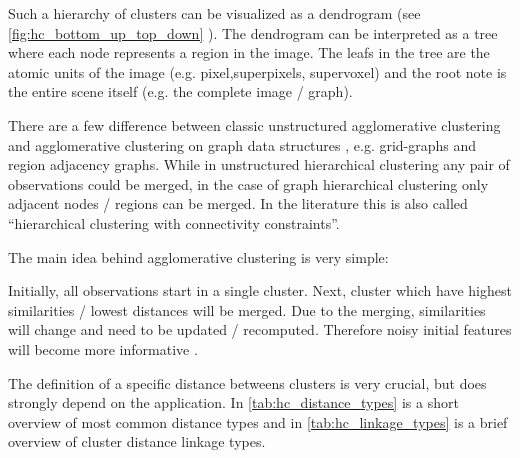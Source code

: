 Such a hierarchy of clusters can be visualized as a dendrogram (see \cref{fig:hc_bottom_up_top_down} ).
The dendrogram can be interpreted as a tree where each node represents a
region in the image.
The leafs in the tree are the atomic units of the image (e.g. pixel,superpixels, supervoxel)
and the root note is the entire scene itself (e.g. the complete image / graph).

There are a few difference between classic unstructured agglomerative clustering
\citep{florek_1951,sokal_1958_science_bulletin,ward_63_jasa}
and agglomerative clustering on graph data structures \citep{arbelaez_2006_cvpr,iglesias_2013,morel_1995_book}, 
e.g. grid-graphs and region adjacency graphs\citep{vlachos_1993_csv}.
While in unstructured hierarchical clustering any pair of observations could be merged,
in the case of graph hierarchical clustering only adjacent nodes / regions can be merged.
In the literature this is also called ``hierarchical clustering with connectivity constraints''.


The main idea behind agglomerative clustering is very simple:

Initially, all observations start in a single cluster. 
Next, cluster which have highest similarities / lowest distances will be merged.
Due to the merging, similarities will change and need to be updated
/ recomputed. Therefore  noisy initial features
will  become more informative .

The definition of a specific distance betweens clusters is very crucial, 
but does strongly depend on the application.
In \cref{tab:hc_distance_types} is a short overview of most common distance
types and in   \cref{tab:hc_linkage_types} is a  brief overview 
of cluster distance linkage types.









